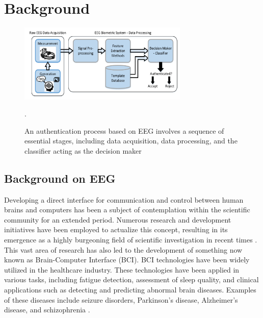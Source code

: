 \chapter{Background}
\label{ch:Foundation}
\begin{figure}
    \centering
     \includegraphics[width=0.72\textwidth]{figures/Authentication pipeline.png}   
    
    \caption{An authentication process based on EEG involves a sequence of essential stages, including data acquisition, data processing, and the classifier acting as the decision maker \cite{arias2023performance}}. 
    \label{fig: BrainInvaders}
    
    
\end{figure}
\section{Background on EEG}
\label{sec:Background:Background on EEG}
Developing a direct interface for communication and control between human brains and computers has been a subject of contemplation within the scientific community for an extended period. Numerous research and development initiatives have been employed to actualize this concept, resulting in its emergence as a highly burgeoning field of scientific investigation in recent times \cite{clinical_trails}. This vast area of research has also led to the development of something now known as Brain-Computer Interface (BCI). BCI technologies have been widely utilized in the healthcare industry. These technologies have been applied in various tasks, including fatigue detection, assessment of sleep quality, and clinical applications such as detecting and predicting abnormal brain diseases. Examples of these diseases include seizure disorders, Parkinson's disease, Alzheimer's disease, and schizophrenia \cite{BCI_applications}.
\smallskip

